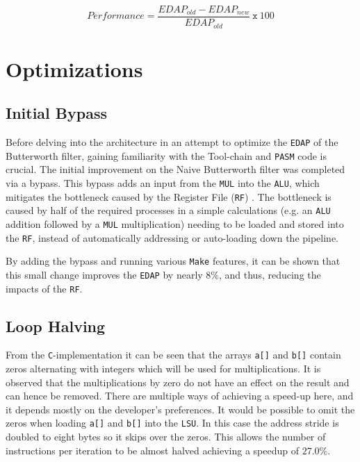\documentclass[letterpaper, 10 pt, conference]{ieeeconf}  %
\begin{document}
\[
Performance = \frac{EDAP_{old}-EDAP_{new}}{EDAP_{old}} \ \texttt{x} \ 100
\]

\section{Optimizations}

\subsection{Initial Bypass}
\label{imp:A}

Before delving into the architecture in an attempt to optimize the \texttt{EDAP} of the Butterworth filter, gaining familiarity with the Tool-chain and \texttt{PASM} code is crucial. The initial improvement on the Naive Butterworth filter was completed via a bypass. This bypass adds an input from the \texttt{MUL} into the \texttt{ALU}, which mitigates the bottleneck caused by the Register File (\texttt{RF}) . The bottleneck is caused by half of the required processes in a simple calculations (e.g. an \texttt{ALU} addition followed by a \texttt{MUL} multiplication) needing to be loaded and stored into the \texttt{RF}, instead of automatically addressing or auto-loading down the pipeline. 

By adding the bypass and running various \texttt{Make} features, it can be shown that this small change improves the \texttt{EDAP} by nearly $8\%$, and thus, reducing the impacts of the \texttt{RF}. 

\subsection{Loop Halving}
\label{imp:B}

From the \texttt{C}-implementation it can be seen that the arrays \texttt{a[]} and \texttt{b[]} contain zeros alternating with integers which will be used for multiplications. It is observed that the multiplications by zero do not have an effect on the result and can hence be removed. There are multiple ways of achieving a speed-up here, and it depends mostly on the developer's preferences. It would be possible to omit the zeros when loading \texttt{a[]} and \texttt{b[]} into the \texttt{LSU}. In this case the address stride is doubled to eight bytes so it skips over the zeros. This allows the number of instructions per iteration to be almost halved achieving a speedup of $27.0\%$.
\end{document}
